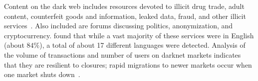 \label{sec:sysml:related}
Content on the dark web includes resources devoted to illicit drug trade, adult content, counterfeit goods and information, leaked data, fraud, and other illicit services~\citep{biryukov2014content}. 
Also included are forums discussing politics, anonymization, and cryptocurrency. 
\citet{biryukov2014content} found that while a vast majority of these services were in English (about $84\%$), a total of about 17 different languages were detected.
Analysis of the volume of transactions and number of users on darknet markets indicates that they are resilient to closures; rapid migrations to newer markets occur when one market shuts down~\citep{elbahrawy2019collective}.

\begin{comment}
\textcolor{teal}{Recent work analyzed vendor listings to identify sybil vendors and link them across markets~\cite{kumar2020edarkfind,tai2019adversarial}. 
These works focus on the textual content of the vendor listing, along with heuristics based on the specific items on sale. 
\citet{xiangwen2018you} integrated features from product photos available in listings to aid this analysis. However, most darknet markets also have associated forums where users discuss vendor identities and build trust~\cite{lorenzo2018know}, but these forums discussions remain underutilized for identity analysis, which is the focus of our work.} 
\end{comment}

